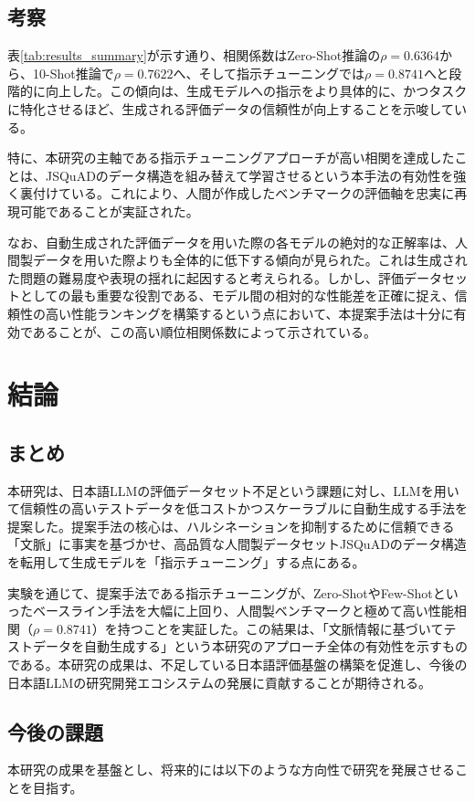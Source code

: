 \documentclass[a4paper,11pt]{jreport}
\begin{document}
\section{考察}
表\ref{tab:results_summary}が示す通り、相関係数はZero-Shot推論の$\rho=0.6364$から、10-Shot推論で$\rho=0.7622$へ、そして指示チューニングでは$\rho=0.8741$へと段階的に向上した。この傾向は、生成モデルへの指示をより具体的に、かつタスクに特化させるほど、生成される評価データの信頼性が向上することを示唆している。

特に、本研究の主軸である指示チューニングアプローチが高い相関を達成したことは、JSQuADのデータ構造を組み替えて学習させるという本手法の有効性を強く裏付けている。これにより、人間が作成したベンチマークの評価軸を忠実に再現可能であることが実証された。

なお、自動生成された評価データを用いた際の各モデルの絶対的な正解率は、人間製データを用いた際よりも全体的に低下する傾向が見られた。これは生成された問題の難易度や表現の揺れに起因すると考えられる。しかし、評価データセットとしての最も重要な役割である、モデル間の相対的な性能差を正確に捉え、信頼性の高い性能ランキングを構築するという点において、本提案手法は十分に有効であることが、この高い順位相関係数によって示されている。






\chapter{結論}
\section{まとめ}
本研究は、日本語LLMの評価データセット不足という課題に対し、LLMを用いて信頼性の高いテストデータを低コストかつスケーラブルに自動生成する手法を提案した。提案手法の核心は、ハルシネーションを抑制するために信頼できる「文脈」に事実を基づかせ、高品質な人間製データセットJSQuADのデータ構造を転用して生成モデルを「指示チューニング」する点にある。

実験を通じて、提案手法である指示チューニングが、Zero-ShotやFew-Shotといったベースライン手法を大幅に上回り、人間製ベンチマークと極めて高い性能相関（$\rho = 0.8741$）を持つことを実証した。この結果は、「文脈情報に基づいてテストデータを自動生成する」という本研究のアプローチ全体の有効性を示すものである。本研究の成果は、不足している日本語評価基盤の構築を促進し、今後の日本語LLMの研究開発エコシステムの発展に貢献することが期待される。

\section{今後の課題}
本研究の成果を基盤とし、将来的には以下のような方向性で研究を発展させることを目指す。
\end{document}
